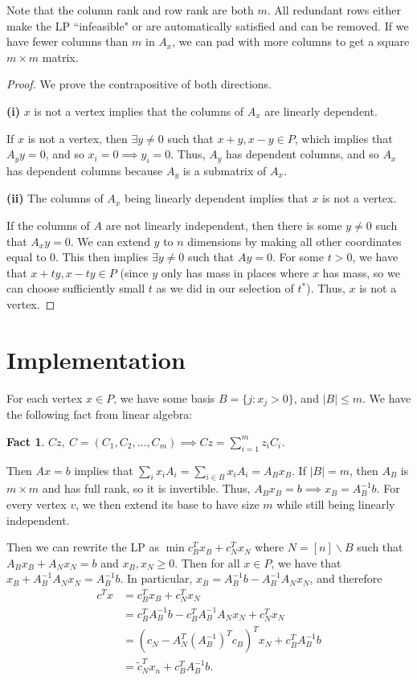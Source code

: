 \documentclass[11pt]{article}
\newtheorem{fact}[theorem]{Fact}
\begin{document}
Note that the column rank and row rank are both $m$. All redundant rows either make the LP ``infeasible" or are automatically satisfied and can be removed. If we have fewer columns than $m$ in $A_x$, we can pad with more columns to get a square $m\times m$ matrix. 

\begin{proof}
We prove the contrapositive of both directions.

{\bf (i)} $x$ is not a vertex implies that the columns of $A_x$ are linearly dependent.

If $x$ is not a vertex, then $\exists y\ne 0$ such that $x+y,x-y\in P$, which implies that $A_yy=0$, and so $x_i=0\implies y_i=0$. Thus, $A_y$ has dependent columns, and so $A_x$ has dependent columns because $A_y$ is a submatrix of $A_x$.

{\bf (ii)} The columns of $A_x$ being linearly dependent implies that $x$ is not a vertex.

If the columns of $A$ are not linearly independent, then there is some $y\ne 0$ such that $A_xy=0$. We can extend $y$ to $n$ dimensions by making all other coordinates equal to 0. This then implies $\exists y\ne 0$ such that $Ay=0$. For some $t>0$, we have that $x+ty,x-ty\in P$ (since $y$ only has mass in places where $x$ has mass, so we can choose sufficiently small $t$ as we did in our selection of $t^*$). Thus, $x$ is not a vertex.
\end{proof}

\section{Implementation}

For each vertex $x\in P$, we have some basis $B=\{j:x_j>0\}$, and $|B|\le m$. We have the following fact from linear algebra:

\begin{fact}
$Cz, ~C = (C_1,C_2,\ldots,C_m) \implies Cz=\sum_{i=1}^mz_iC_i$.
\end{fact}

Then $Ax=b$ implies that $\sum_ix_iA_i=\sum_{i\in B}x_iA_i=A_Bx_B$. If $|B|=m$, then $A_B$ is $m\times m$ and has full rank, so it is invertible. Thus, $A_Bx_B=b\implies x_B=A_B^{-1}b$. For every vertex $v$, we then extend its base to have size $m$ while still being linearly independent.

Then we can rewrite the LP as $\min c^T_Bx_B+c_N^Tx_N$ where $N=[n]\backslash B$ such that $A_Bx_B+A_Nx_N=b$ and $x_B,x_N\ge 0$. Then for all $x\in P$, we have that $x_B+A_B^{-1}A_Nx_N=A_B^{-1}b$. In particular, $x_B=A_B^{-1}b-A_{B}^{-1}A_Nx_N$, and therefore \begin{align*}
c^Tx &= c_B^Tx_B+c_N^Tx_N \\
{}&= c_B^TA_B^{-1}b-c_B^TA_B^{-1}A_Nx_N+c_N^Tx_N\\
{}&= (c_N-A_N^T(A_B^{-1})^Tc_B)^Tx_N+c_B^TA_B^{-1}b\\
{}&= \tilde{c}^T_Nx_n+c_B^TA_B^{-1}b.
\end{align*}
\end{document}
